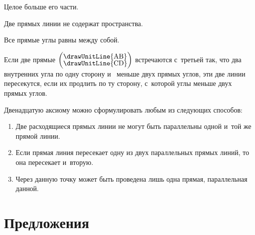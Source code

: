 \documentclass[letters,booklanguage=russian]{byrnebook}
\begin{document}
\startaxiom{}\label{ax:I.IX}
\begin{center}
Целое больше его части.
\end{center}

\startaxiom{}\label{ax:I.X}
\begin{center}
Две прямых линии не содержат пространства.
\end{center}

\startaxiom{}\label{ax:I.XI}
\begin{center}
Все прямые углы равны между собой.
\end{center}

\startaxiom{}\label{ax:I.XII}
\drawCurrentPictureInMargin
Если две прямые $\left(\vcenter{\nointerlineskip\hbox{\drawUnitLine{AB}}\nointerlineskip\hbox{\drawUnitLine{CD}}}\right)$ встречаются с~третьей  так, что два внутренних угла по одну сторону  и~ меньше двух прямых углов, эти две линии пересекутся, если их продлить по ту сторону, с~которой углы меньше двух прямых углов.

Двенадцатую аксиому можно сформулировать любым из следующих способов:
\begin{enumerate}
\item Две расходящиеся прямых линии не могут быть параллельны одной и~той же прямой линии.
\item Если прямая линия пересекает одну из двух параллельных прямых линий, то она пересекает и~вторую.
\item Через данную точку может быть проведена лишь одна прямая, параллельная данной.
\end{enumerate}

\chapter*{Предложения}
\end{document}
